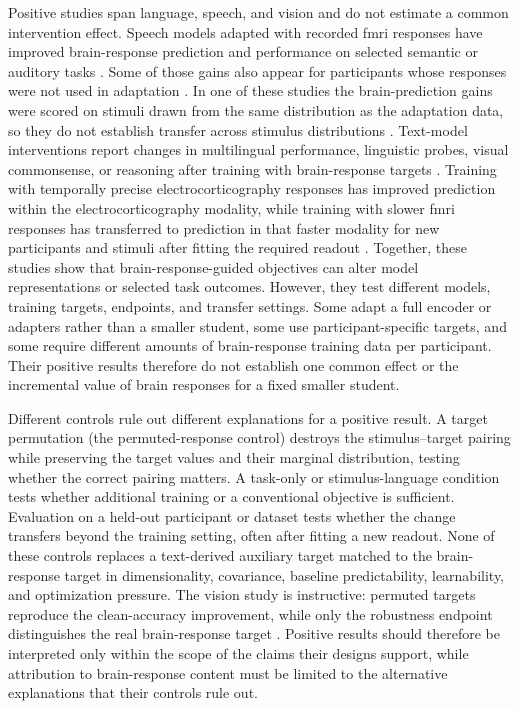 Positive studies span language, speech, and vision and do not estimate a common intervention effect.
Speech models adapted with recorded \ac{fmri} responses have improved brain-response prediction and performance on selected semantic or auditory tasks \autocite{moussa2025,moussa2025b,freteault2025}.
Some of those gains also appear for participants whose responses were not used in adaptation \autocite{moussa2025b}.
In one of these studies the brain-prediction gains were scored on stimuli drawn from the same distribution as the adaptation data, so they do not establish transfer across stimulus distributions \autocite{freteault2025}.
Text-model interventions report changes in multilingual performance, linguistic probes, visual commonsense, or reasoning after training with brain-response targets \autocite{negi2025,bilgin2026,merlinData2026,xiao2026}.
Training with temporally precise electrocorticography responses has improved prediction within the electrocorticography modality, while training with slower \ac{fmri} responses has transferred to prediction in that faster modality for new participants and stimuli after fitting the required readout \autocite{zhang2026,vaidya2026}.
Together, these studies show that brain-response-guided objectives can alter model representations or selected task outcomes.
However, they test different models, training targets, endpoints, and transfer settings.
Some adapt a full encoder or adapters rather than a smaller student, some use participant-specific targets, and some require different amounts of brain-response training data per participant.
Their positive results therefore do not establish one common effect or the incremental value of brain responses for a fixed smaller student.

Different controls rule out different explanations for a positive result.
A target permutation (the permuted-response control) destroys the stimulus--target pairing while preserving the target values and their marginal distribution, testing whether the correct pairing matters.
A task-only or stimulus-language condition tests whether additional training or a conventional objective is sufficient.
Evaluation on a held-out participant or dataset tests whether the change transfers beyond the training setting, often after fitting a new readout.
None of these controls replaces a text-derived auxiliary target matched to the brain-response target in dimensionality, covariance, baseline predictability, learnability, and optimization pressure.
The vision study is instructive: permuted targets reproduce the clean-accuracy improvement, while only the robustness endpoint distinguishes the real brain-response target \autocite{pirlot2022}.
Positive results should therefore be interpreted only within the scope of the claims their designs support, while attribution to brain-response content must be limited to the alternative explanations that their controls rule out.

